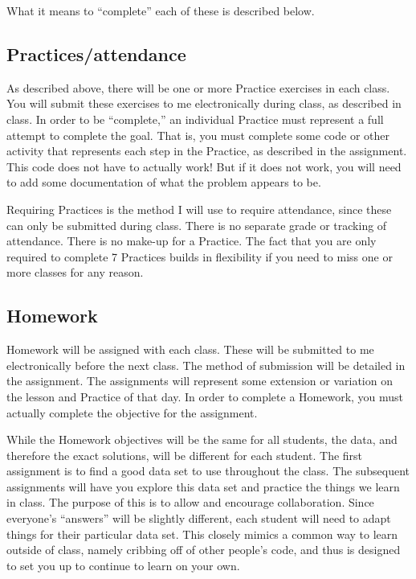 \documentclass{tufte-handout}
\begin{document}
What it means to ``complete'' each of these is described below.
\subsection*{Practices/attendance}
\label{sec:orgheadline7}
As described above, there will be one or more Practice exercises in each class. You will submit these exercises to me electronically during class, as described in class.  In order to be ``complete,'' an individual Practice must represent a full attempt to complete the goal.  That is, you must complete some code or other activity that represents each step in the Practice, as described in the assignment.  This code does not have to actually work!  But if it does not work, you will need to add some documentation of what the problem appears to be.

Requiring Practices is the method I will use to require attendance, since these can only be submitted during class.  There is no separate grade or tracking of attendance.  There is no make-up for a Practice.  The fact that you are only required to complete 7 Practices builds in flexibility if you need to miss one or more classes for any reason. 

\subsection*{Homework}
\label{sec:orgheadline8}
Homework will be assigned with each class.  These will be submitted to me electronically before the next class.  The method of submission will be detailed in the assignment. The assignments will represent some extension or variation on the lesson and Practice of that day.  In order to complete a Homework, you must actually complete the objective for the assignment.  

While the Homework objectives will be the same for all students, the data, and therefore the exact solutions, will be different for each student.  The first assignment is to find a good data set to use throughout the class.  The subsequent assignments will have you explore this data set and practice the things we learn in class.  The purpose of this is to allow and encourage collaboration.  Since everyone's ``answers'' will be slightly different, each student will need to adapt things for their particular data set.  This closely mimics a common way to learn outside of class, namely cribbing off of other people's code, and thus is designed to set you up to continue to learn on your own.
\end{document}
